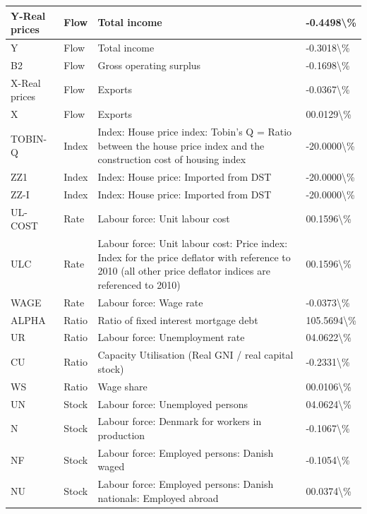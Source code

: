 \documentclass[
]{book}
\begin{document}
\begin{table}
\begin{tabular}[t]{l|l|l|l}
Y-Real prices & Flow & Total income & -0.4498\textbackslash{}\%\\
\hline
Y & Flow & Total income & -0.3018\textbackslash{}\%\\
\hline
B2 & Flow & Gross operating surplus & -0.1698\textbackslash{}\%\\
\hline
X-Real prices & Flow & Exports & -0.0367\textbackslash{}\%\\
\hline
X & Flow & Exports & 00.0129\textbackslash{}\%\\
\hline
TOBIN-Q & Index & Index: House price index: Tobin's Q = Ratio between the house price index and the construction cost of housing index & -20.0000\textbackslash{}\%\\
\hline
ZZ1 & Index & Index: House price: Imported from DST & -20.0000\textbackslash{}\%\\
\hline
ZZ-I & Index & Index: House price: Imported from DST & -20.0000\textbackslash{}\%\\
\hline
UL-COST & Rate & Labour force: Unit labour cost & 00.1596\textbackslash{}\%\\
\hline
ULC & Rate & Labour force: Unit labour cost: Price index: Index for the price deflator with reference to 2010 (all other price deflator indices are referenced to 2010) & 00.1596\textbackslash{}\%\\
\hline
WAGE & Rate & Labour force: Wage rate & -0.0373\textbackslash{}\%\\
\hline
ALPHA & Ratio & Ratio of fixed interest mortgage debt & 105.5694\textbackslash{}\%\\
\hline
UR & Ratio & Labour force: Unemployment rate & 04.0622\textbackslash{}\%\\
\hline
CU & Ratio & Capacity Utilisation (Real GNI  /  real capital stock) & -0.2331\textbackslash{}\%\\
\hline
WS & Ratio & Wage share & 00.0106\textbackslash{}\%\\
\hline
UN & Stock & Labour force: Unemployed persons & 04.0624\textbackslash{}\%\\
\hline
N & Stock & Labour force: Denmark for workers in production & -0.1067\textbackslash{}\%\\
\hline
NF & Stock & Labour force: Employed persons: Danish waged & -0.1054\textbackslash{}\%\\
\hline
NU & Stock & Labour force: Employed persons: Danish nationals: Employed abroad & 00.0374\textbackslash{}\%\\
\hline
\end{tabular}
\end{table}
\end{document}

